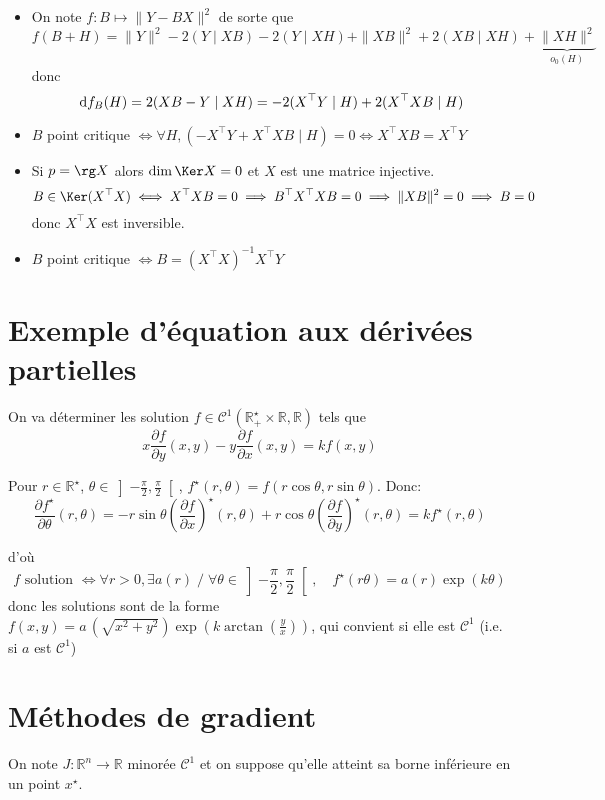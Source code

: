 \begin{itemize}
    \item On note $f:B\longmapsto \|Y-BX\|^2$ de sorte que \[
            f(B+H)=\|Y\|^2-2(Y\;|\;XB)-2(Y\;|\;XH)+\|XB\|^2+2(XB\;|\;XH)+\underbrace{\|XH\|^2}_{o_0(H)}
        \]
        donc \[
            \mathrm{d} f_B(H)=2(XB-Y\;|\;XH)=-2(X^\top Y\;|\; H)+2(X^\top XB\;|\;H)
        \]
    \item $B$ point critique $\iff \forall H, (-X^\top Y+X^\top XB\;|\;H)=0 \iff X^\top XB=X^\top Y$
    \item Si $p=\rg X$ alors $\dim\Ker X=0$ et $X$ est une matrice injective. \[
            B\in \Ker(X^\top X)\iff X^\top XB=0\implies B^\top X^\top XB=0\implies \|XB\|^2=0\implies B=0
        \]
        donc $X^\top X$ est inversible.
    \item $B$ point critique $\iff B=(X^\top X)^{-1}X^\top Y$
\end{itemize}

\section{Exemple d'équation aux dérivées partielles}

On va déterminer les solution $f\in\mathcal C^1(\mathbb R_+^\star\times \mathbb R, \mathbb R)$ tels que \[
    x \frac{\partial f}{\partial y} (x, y)-y \frac{\partial f}{\partial x} (x, y)=k f(x, y)
\]

Pour $r\in\mathbb R^\star$, $\theta\in\left]-\frac\pi2,\frac\pi2\right[$, $f^\star(r, \theta)=f(r\cos\theta,r\sin\theta)$. Donc: \[
    \frac{\partial f^\star}{\partial \theta} (r, \theta)=-r\sin\theta \left(\frac{\partial f}{\partial x}\right)^\star (r, \theta)+r\cos \theta \left(\frac{\partial f}{\partial y}\right)^\star (r,\theta)=kf^\star(r,\theta)
\]

d'où \[
    f \text{ solution }\iff \forall r>0, \exists a(r)\;/\; \forall \theta \in \left]-\frac\pi2,\frac\pi2\right[,\quad f^\star(r\theta)=a(r)\exp(k\theta)
\]
donc les solutions sont de la forme $f(x, y)=a \!\!\,\left( \sqrt{x^2+y^2} \right)\exp \left( k\arctan \left( \frac yx \right) \right)$, qui convient si elle est $\mathcal C^1$ (i.e. si $a$ est $\mathcal C^1$)

\section{Méthodes de gradient}


On note $J:\mathbb R^n\to \mathbb R$ minorée $\mathcal C^1$ et on suppose qu'elle atteint sa borne inférieure en un point $x^\star$.

